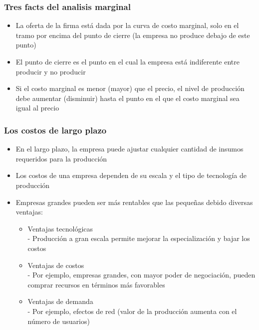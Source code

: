 \documentclass{beamer}
\begin{document}
\begin{frame}
    \frametitle{Tres facts del analisis marginal}
    \begin{itemize}
        \item La oferta de la firma está dada por la curva de costo marginal, solo en el tramo por encima del punto de cierre (la empresa no produce debajo de este punto)
        \item El punto de cierre es el punto en el cual la empresa está indiferente entre producir y no producir
        \item Si el costo marginal es menor (mayor) que el precio, el nivel de producción debe aumentar (disminuir) hasta el punto en el que el costo marginal sea igual al precio
    \end{itemize}
\end{frame}

\begin{frame}
\frametitle{Los costos de largo plazo}
    \begin{itemize}
        \item En el largo plazo, la empresa puede ajustar cualquier cantidad de insumos requeridos para la producción
        \item Los costos de una empresa dependen de su escala y el tipo de tecnología de producción
        \item Empresas grandes pueden ser más rentables que las pequeñas debido diversas ventajas:
        \begin{itemize}
            \item Ventajas tecnológicas \\
            - Producción a gran escala permite mejorar la especialización y bajar los costos
            \item Ventajas de costos \\
            - Por ejemplo, empresas grandes, con mayor poder de negociación, pueden comprar recursos en términos más favorables
            \item Ventajas de demanda \\
            - Por ejemplo, efectos de red (valor de la producción aumenta con el número de usuarios)
        \end{itemize}
    \end{itemize}
\end{frame}
\end{document}
